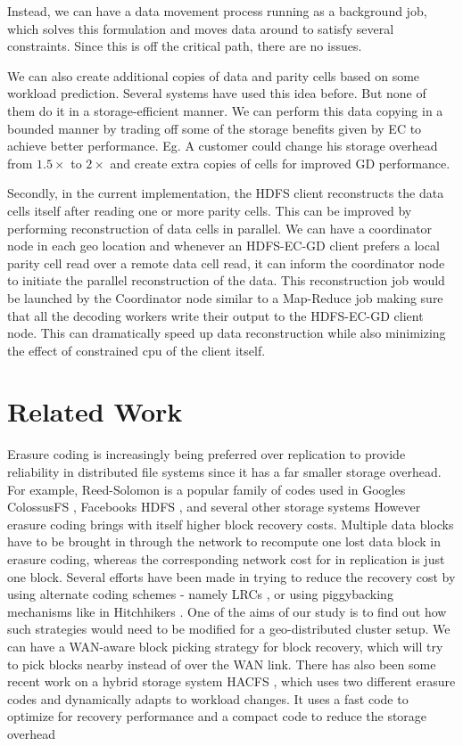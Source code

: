 \documentclass{sig-alternate-05-2015}
\begin{document}
Instead, we can have a data movement process running as a background job, which solves this formulation and moves data around to satisfy several constraints. Since this is off the critical path, there are no issues. 

We can also create additional copies of data and parity cells based on some workload prediction. Several systems \cite{iridium}\cite{clarinet} have used this idea before. But none of them do it in a storage-efficient manner. We can perform this data copying in a bounded manner by trading off some of the storage benefits given by EC to achieve better performance. Eg. A customer could change his storage overhead from $1.5\times $ to $2\times $ and create extra copies of cells for improved GD performance.

Secondly, in the current implementation, the HDFS client reconstructs the data cells itself after reading one or more parity cells. This can be improved by performing reconstruction of data cells in parallel. We can have a coordinator node in each geo location and whenever an HDFS-EC-GD client prefers a local parity cell read over a remote data cell read, it can inform the coordinator node to initiate the parallel reconstruction of the data. This reconstruction job would be launched by the Coordinator node similar to a Map-Reduce job making sure that all the decoding workers write their output to the HDFS-EC-GD client node. This can dramatically speed up data reconstruction while also minimizing the effect of constrained cpu of the client itself. 

\section{Related Work}
Erasure coding is increasingly being preferred over replication to provide reliability in distributed file systems since it has a far smaller storage overhead. For example, Reed-Solomon \cite{RS} is a popular family of codes used in Google\textquotesingle s ColossusFS \cite{colossus}, Facebook\textquotesingle s HDFS \cite{hdfs-raid}, and several other storage systems \cite{rethink, hitchhiker, gpfs}
However erasure coding brings with itself higher block recovery costs. Multiple data blocks have to be brought in through the network to recompute one lost data block in erasure coding, whereas the corresponding network cost for in replication is just one block.  Several efforts have been made in trying to reduce the recovery cost by using alternate coding schemes - namely LRCs \cite{azure}, or using piggybacking mechanisms like in Hitchhiker\textquotesingle s \cite{hitchhiker}. One of the aims of our study is to find out how such strategies would need to be modified for a geo-distributed cluster setup. We can have a WAN-aware block picking strategy for block recovery, which will try to pick blocks nearby instead of over the WAN link.
There has also been some recent work on a hybrid storage system HACFS \cite{tale}, which uses two different erasure codes and dynamically adapts to workload changes. It uses a fast code to optimize for recovery performance and a compact code to reduce the storage overhead
\end{document}
